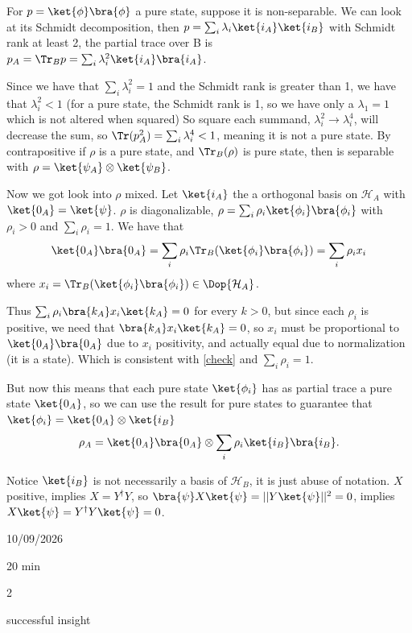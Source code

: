 \begin{solution}
For $p=\ket{\phi}\bra{\phi}$ a pure state, suppose it is non-separable.
We can look at its Schmidt decomposition, then 
$p= \sum_i \lambda_i \ket{i_A}\ket{i_B}$ with Schmidt rank at least 2, the partial trace over B is 
$p_A = \Tr_B p = \sum_i \lambda_i^2 \ket{i_A}\bra{i_A}$.

Since we have that $\sum_i \lambda_i^2 =1$ and the Schmidt rank is greater than 1, we have that $\lambda_i^2 < 1$  (for a pure state, the Schmidt rank is 1, so we have only a $\lambda_1=1$ which is not altered when squared)
So square each summand, $\lambda_i^2 \rightarrow \lambda_i^4$, will decrease the sum, so
$\Tr( p_A^2) = \sum_i \lambda_i^4 < 1$, meaning it is not a pure state.  
By contrapositive if $\rho$ is a pure state, and $\Tr_B(\rho)$ is  pure state, then is separable with $\rho =\ket{\psi_A}\otimes\ket{\psi_B}$.

Now we got look into $\rho$ mixed. Let $\ket{i_A}$ the a orthogonal basis on $\mathcal{H}_A$ with $\ket{0_A}=\ket{\psi}$. 
$\rho$ is diagonalizable, $\rho=\sum_i \rho_i \ket{\phi_i}\bra{\phi_i}$ with $\rho_i>0$ and $\sum_i \rho_i=1$.
We have that
\begin{equation}
    \ket{0_A}\bra{0_A}=\sum_i \rho_i \Tr_B(\ket{\phi_i}\bra{\phi_i})=\sum_i \rho_i x_i
    \label{check}
\end{equation}
where $x_i=\Tr_B(\ket{\phi_i}\bra{\phi_i}) \in \Dop{\mathcal H_A}$.

Thus $\sum_i \rho_i \bra{k_A}x_i\ket{k_A}=0$
for every $k>0$, but since each $\rho_i$ is positive, we need that $\bra{k_A}x_i\ket{k_A}=0$, so
$x_i$ must be proportional to $\ket{0_A}\bra{0_A}$ due to $x_i$ positivity, and actually equal due to normalization (it is a state). Which is consistent with \eqref{check} and $\sum_i \rho_i=1$.

But now this means that each pure state $\ket{\phi_i}$ has as partial trace a pure state $\ket{0_A}$, so we can use the result for pure states to guarantee that $\ket{\phi_i}=\ket{0_A} \otimes \ket{i_B}$
$$\rho_A= \ket{0_A}\bra{0_A} \otimes \sum_i \rho_i \ket{i_B}\bra{i_B}.$$

Notice $\ket{i_B}$ is not necessarily a basis of $\mathcal H_B$, it is just abuse of notation.
$X$ positive, implies $X=Y^\dagger Y$, so $\bra{\psi}X\ket{\psi}=||Y\ket{\psi}||^2=0$, implies $X\ket{\psi}=Y^\dagger Y\ket{\psi}=0$.
\end{solution}


\begin{attemptlog}
  \item[Date] 10/09/2026
  \item[Time taken] 20 min
  \item[Difficulty] 2
  \item[User Opinion] successful insight
\end{attemptlog}